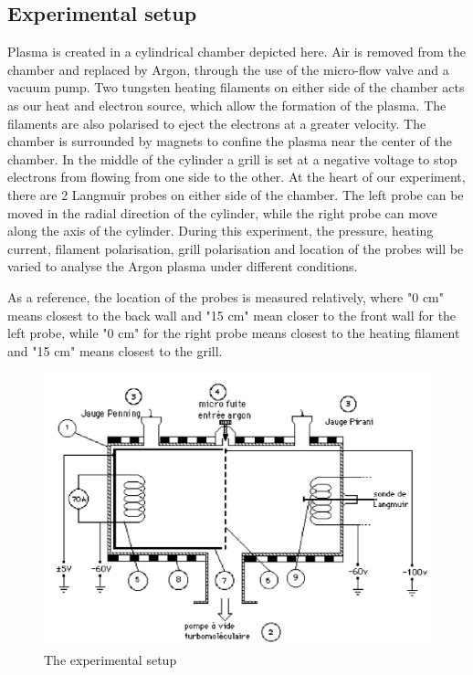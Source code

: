\subsection{Experimental setup}
Plasma is created in a cylindrical chamber depicted here. Air is removed from the chamber and replaced by Argon, through the use of the micro-flow valve and a vacuum pump. Two tungsten heating filaments on either side of the chamber acts as our heat and electron source, which allow the formation of the plasma. The filaments are also polarised to eject the electrons at a greater velocity. The chamber is surrounded by magnets to confine the plasma near the center of the chamber.
In the middle of the cylinder a grill is set at a negative voltage to stop electrons from flowing from one side to the other.
At the heart of our experiment, there are 2 Langmuir probes on either side of the chamber. The left probe can be moved in the radial direction of the cylinder, while the right probe can move along the axis of the cylinder.
During this experiment, the pressure, heating current, filament polarisation, grill polarisation and location of the probes will be varied to analyse the Argon plasma under different conditions.

As a reference, the location of the probes is measured relatively, where "0 cm" means closest to the back wall and "15 cm" mean closer to the front wall for the left probe, while "0 cm" for the right probe means closest to the heating filament and "15 cm" means closest to the grill.



\begin{figure}
    \centering
    \includegraphics[width=12cm]{figures/experimental-setup.png}
    \caption{The experimental setup}
    \label{fig:experimental_setup}
\end{figure}

